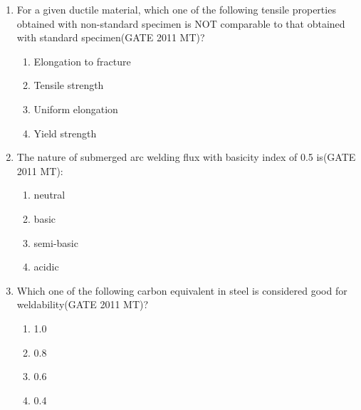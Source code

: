 \documentclass[12pt]{article}
\begin{document}
\begin{enumerate}
\item For a given ductile material, which one of the following tensile properties obtained with non-standard specimen is NOT comparable to that obtained with standard specimen(GATE 2011 MT)?
    \begin{enumerate}
        \item Elongation to fracture
        \item Tensile strength
        \item Uniform elongation
        \item Yield strength
    \end{enumerate}

\item The nature of submerged arc welding flux with basicity index of 0.5 is(GATE 2011 MT):
    \begin{enumerate}
        \item neutral
        \item basic
        \item semi-basic
        \item acidic
    \end{enumerate}

\item Which one of the following carbon equivalent in steel is considered good for weldability(GATE 2011 MT)?
    \begin{enumerate}
        \item 1.0
        \item 0.8
        \item 0.6
        \item 0.4
    \end{enumerate}



\end{enumerate}
\end{document}
